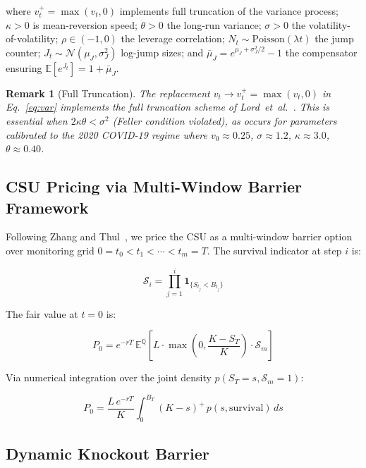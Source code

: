 \documentclass[12pt]{article}
\newtheorem{remark}{Remark}
\begin{document}
where $v_t^+ = \max(v_t, 0)$ implements full truncation of the variance process;
$\kappa > 0$ is mean-reversion speed; $\theta > 0$ the long-run variance; $\sigma > 0$
the volatility-of-volatility; $\rho \in (-1,0)$ the leverage correlation;
$N_t \sim \text{Poisson}(\lambda t)$ the jump counter; $J_t \sim \mathcal{N}(\mu_J, \sigma_J^2)$
log-jump sizes; and $\bar{\mu}_J = e^{\mu_J + \sigma_J^2/2} - 1$ the compensator ensuring
$\mathbb{E}[e^{J_t}] = 1 + \bar{\mu}_J$.

\begin{remark}[Full Truncation]
The replacement $v_t \to v_t^+ = \max(v_t, 0)$ in Eq.~\eqref{eq:var} implements the
\emph{full truncation} scheme of Lord~et~al.~\cite{lord2010comparison}. This is essential
when $2\kappa\theta < \sigma^2$ (Feller condition violated), as occurs for parameters
calibrated to the 2020 COVID-19 regime where $v_0 \approx 0.25$, $\sigma \approx 1.2$,
$\kappa \approx 3.0$, $\theta \approx 0.40$.
\end{remark}

\subsection{CSU Pricing via Multi-Window Barrier Framework}

Following Zhang and Thul~\cite{zhang2017gap}, we price the CSU as a multi-window barrier option
over monitoring grid $0 = t_0 < t_1 < \cdots < t_m = T$. The survival indicator at step $i$ is:

\begin{equation}
    \mathcal{S}_i = \prod_{j=1}^{i} \mathbf{1}_{\{S_{t_j} < B_{t_j}\}}
\end{equation}

The fair value at $t=0$ is:

\begin{equation}
    P_0 = e^{-rT}\,\mathbb{E}^{\mathbb{Q}}\!\left[
        L \cdot \max\!\left(0, \frac{K - S_T}{K}\right) \cdot \mathcal{S}_m
    \right]
    \label{eq:price_formula}
\end{equation}

Via numerical integration over the joint density $p(S_T = s, \mathcal{S}_m = 1)$:

\begin{equation}
    P_0 = \frac{L\,e^{-rT}}{K} \int_0^{B_T} (K - s)^+\, p(s, \text{survival})\,ds
\end{equation}

\subsection{Dynamic Knockout Barrier}
\end{document}
